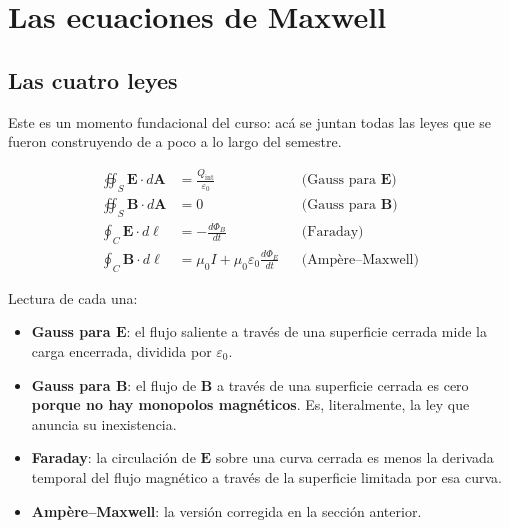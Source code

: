 \documentclass[12pt,a4paper]{article}
\begin{document}
\section{Las ecuaciones de Maxwell}

\subsection{Las cuatro leyes}

Este es un momento fundacional del curso: acá se juntan todas las leyes que
se fueron construyendo de a poco a lo largo del semestre.

\begin{keybox}
\begin{align*}
\oiint_S \mathbf{E}\cdot d\mathbf{A}
  &= \frac{Q_{\text{int}}}{\varepsilon_0}
  && \text{(Gauss para } \mathbf{E}\text{)} \\[6pt]
\oiint_S \mathbf{B}\cdot d\mathbf{A}
  &= 0
  && \text{(Gauss para } \mathbf{B}\text{)} \\[6pt]
\oint_C \mathbf{E}\cdot d\boldsymbol{\ell}
  &= -\frac{d\Phi_B}{dt}
  && \text{(Faraday)} \\[6pt]
\oint_C \mathbf{B}\cdot d\boldsymbol{\ell}
  &= \mu_0 I + \mu_0\varepsilon_0\frac{d\Phi_E}{dt}
  && \text{(Ampère--Maxwell)}
\end{align*}
\end{keybox}

Lectura de cada una:

\begin{itemize}
  \item \textbf{Gauss para $\mathbf{E}$}: el flujo saliente a través de una
        superficie cerrada mide la carga encerrada, dividida por
        $\varepsilon_0$.
  \item \textbf{Gauss para $\mathbf{B}$}: el flujo de $\mathbf{B}$ a través
        de una superficie cerrada es cero \textbf{porque no hay monopolos
        magnéticos}. Es, literalmente, la ley que anuncia su inexistencia.
  \item \textbf{Faraday}: la circulación de $\mathbf{E}$ sobre una curva
        cerrada es menos la derivada temporal del flujo magnético a través de
        la superficie limitada por esa curva.
  \item \textbf{Ampère--Maxwell}: la versión corregida en la sección
        anterior.
\end{itemize}
\end{document}
